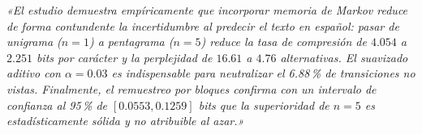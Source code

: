 \documentclass[11pt,letterpaper]{article}
\begin{document}
\textit{«El estudio demuestra empíricamente que incorporar memoria de Markov reduce de forma contundente la incertidumbre al predecir el texto en español: pasar de unigrama ($n=1$) a pentagrama ($n=5$) reduce la tasa de compresión de $4.054$ a $2.251$ bits por carácter y la perplejidad de $16.61$ a $4.76$ alternativas. El suavizado aditivo con $\alpha=0.03$ es indispensable para neutralizar el 6.88\,\% de transiciones no vistas. Finalmente, el remuestreo por bloques confirma con un intervalo de confianza al 95\,\% de $[0.0553, 0.1259]$ bits que la superioridad de $n=5$ es estadísticamente sólida y no atribuible al azar.»}
\end{document}
